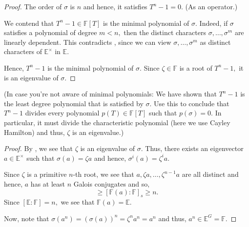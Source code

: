 \primeigenvalue*\label{lem:primeigenvalue2}
\begin{flushright}\hyperref[lem:primeigenvalue]{\upsym}\end{flushright}
\begin{proof}
    The order of $\sigma$ is $n$ and hence, it satisfies $T^n - 1 = 0.$ (As an operator.)

    We contend that $T^n - 1 \in \mathbb{F}[T]$ is the minimal polynomial of $\sigma.$ Indeed, if $\sigma$ satisfies a polynomial of degree $m < n,$ then the distinct characters $\sigma, \ldots, \sigma^m$ are linearly dependent. This contradicts , since we can view $\sigma, \ldots, \sigma^m$ as distinct characters of $\mathbb{E}^\times$ in $\mathbb{E}.$

    Hence, $T^n - 1$ is the minimal polynomial of $\sigma.$ Since $\zeta \in \mathbb{F}$ is a root of $T^n - 1,$ it is an eigenvalue of $\sigma.$
\end{proof}

(In case you're not aware of minimal polynomials: We have shown that $T^n - 1$ is the least degree polynomial that is satisfied by $\sigma.$ Use this to conclude that $T^n - 1$ divides every polynomial $p(T) \in \mathbb{F}[T]$ such that $p(\sigma) = 0.$ In particular, it must divide the characteristic polynomial (here we use Cayley Hamilton) and thus, $\zeta$ is an eigenvalue.)

\cyclicextprimroot*\label{thm:cyclicextprimroot2}
\begin{flushright}\hyperref[thm:cyclicextprimroot]{\upsym}\end{flushright}
\begin{proof}
    By , we see that $\zeta$ is an eigenvalue of $\sigma.$ Thus, there exists an eigenvector $a \in \mathbb{E}^\times$ such that $\sigma(a) = \zeta a$ and hence, $\sigma^i(a) = \zeta^i a.$

    Since $\zeta$ is a primitive $n$-th root, we see that $a, \zeta a, \ldots, \zeta^{n - 1}a$ are all distinct and hence, $a$ has at least $n$ Galois conjugates and so, 
    \begin{equation*} 
        [\mathbb{F}(a) : \mathbb{F}] \ge [\mathbb{F}(a) : \mathbb{F}]_s \ge n.
    \end{equation*}
    Since $[\mathbb{E} : \mathbb{F}] = n,$ we see that $\mathbb{F}(a) = \mathbb{E}.$ 

    Now, note that $\sigma(a^n) = (\sigma(a))^n = \zeta^na^n = a^n$ and thus, $a^n \in \mathbb{E}^G = \mathbb{F}.$
\end{proof}

